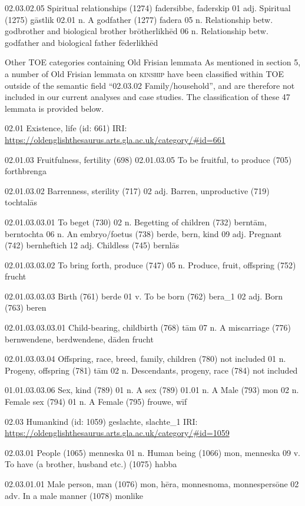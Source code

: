 02.03.02.05 Spiritual relationships (1274)		fadersibbe, faderskip
	01 adj. Spiritual (1275)		gāstlik
		02.01 n. A godfather (1277)		fadera
	05 n. Relationship betw. godbrother and biological brother	brōtherlikhēd
	06 n. Relationship betw. godfather and biological father	fēderlikhēd


Other TOE categories containing Old Frisian lemmata
As mentioned in section 5, a number of Old Frisian lemmata on \textsc{kinship} have been classified within TOE outside of the semantic field “02.03.02 Family/household”, and are therefore not included in our current analyses and case studies. The classification of these 47 lemmata is provided below.
 
02.01 Existence, life (id: 661) 
IRI: \url{https://oldenglishthesaurus.arts.gla.ac.uk/category/#id=661}

02.01.03 Fruitfulness, fertility (698)
	02.01.03.05 To be fruitful, to produce (705)		forthbrenga

02.01.03.02 Barrenness, sterility (717)
	02 adj. Barren, unproductive (719)		tochtalās

02.01.03.03.01 To beget (730)
	02 n. Begetting of children (732)		berntām, berntochta
	06 n. An embryo/foetus (738)		berde, bern, kind
	09 adj. Pregnant (742)		bernheftich
	12 adj. Childless (745)		bernlās

02.01.03.03.02 To bring forth, produce (747)		
	05 n. Produce, fruit, offspring (752)		frucht

02.01.03.03.03 Birth (761)		berde
	01 v. To be born (762)		bera\_1
	02 adj. Born (763)		beren

	02.01.03.03.03.01 Child-bearing, childbirth (768)	tām
		07 n. A miscarriage (776)		bernwendene, berdwendene, dāden frucht

	02.01.03.03.04 Offspring, race, breed, family, children (780)	not included
	01 n. Progeny, offspring (781)		tām
		02 n. Descendants, progeny, race (784)		not included

	01.01.03.03.06 Sex, kind (789) 		
	01 n. A sex (789)
		01.01 n. A Male (793)		mon
			02 n. Female sex (794)
				01 n. A Female (795)		frouwe, wīf


02.03 Humankind (id: 1059) 		geslachte, slachte\_1
IRI: \url{https://oldenglishthesaurus.arts.gla.ac.uk/category/#id=1059}

02.03.01 People (1065)		menneska
	01 n. Human being (1066)		mon, menneska
	09 v. To have (a brother, husband etc.) (1075)		habba

	02.03.01.01 Male person, man (1076)		mon, hēra, monnesnoma, monnespersōne
		02 adv. In a male manner (1078)		monlike

